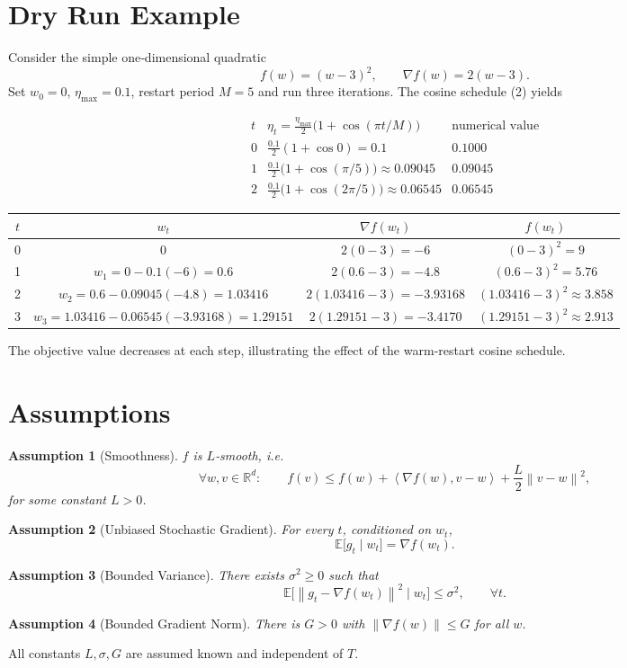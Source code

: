 \documentclass{article}
\newtheorem{assumption}{Assumption}
\newcommand{\E}{\mathbb{E}}
\newcommand{\R}{\mathbb{R}}
\newcommand{\norm}[1]{\left\lVert #1 \right\rVert}
\newcommand{\ip}[2]{\left\langle #1,#2 \right\rangle}
\begin{document}
\section*{Dry Run Example}
Consider the simple one‑dimensional quadratic
\[
f(w)=(w-3)^2,\qquad \nabla f(w)=2(w-3).
\]
Set $w_0=0$, $\eta_{\max}=0.1$, restart period $M=5$ and run three
iterations.  The cosine schedule (2) yields

\[
\begin{array}{c|c|c}
t & \displaystyle\eta_t
     =\tfrac{\eta_{\max}}{2}\bigl(1+\cos(\pi t/M)\bigr) & 
\displaystyle\text{numerical value}\\ \hline
0 & \tfrac{0.1}{2}(1+\cos 0)=0.1 & 0.1000\\
1 & \tfrac{0.1}{2}\bigl(1+\cos(\pi/5)\bigr)
   \approx0.09045 & 0.09045\\
2 & \tfrac{0.1}{2}\bigl(1+\cos(2\pi/5)\bigr)
   \approx0.06545 & 0.06545
\end{array}
\]

\begin{center}
\begin{tabular}{c|c|c|c}
$t$ & $w_t$ & $\nabla f(w_t)$ & $f(w_t)$\\ \hline
0 & $0$ &
$2(0-3)=-6$ &
$(0-3)^2=9$\\
1 & $w_1=0-0.1(-6)=0.6$ &
$2(0.6-3)=-4.8$ &
$(0.6-3)^2=5.76$\\
2 & $w_2=0.6-0.09045(-4.8)=1.03416$ &
$2(1.03416-3)=-3.93168$ &
$(1.03416-3)^2\approx3.858$\\
3 & $w_3=1.03416-0.06545(-3.93168)=1.29151$ &
$2(1.29151-3)=-3.4170$ &
$(1.29151-3)^2\approx2.913$
\end{tabular}
\end{center}
The objective value decreases at each step, illustrating the effect of the
warm‑restart cosine schedule.

\section*{Assumptions}
\begin{assumption}[Smoothness]\label{ass:smooth}
$f$ is $L$‑smooth, i.e.
\[
\forall w,v\in\R^{d}:\qquad
f(v)\le f(w)+\ip{\nabla f(w)}{v-w}+\frac{L}{2}\norm{v-w}^{2},
\]
for some constant $L>0$.
\end{assumption}
\begin{assumption}[Unbiased Stochastic Gradient]\label{ass:unbiased}
For every $t$, conditioned on $w_t$,
\[
\E\bigl[g_t\mid w_t\bigr]=\nabla f(w_t).
\]
\end{assumption}
\begin{assumption}[Bounded Variance]\label{ass:variance}
There exists $\sigma^{2}\ge0$ such that
\[
\E\bigl[\norm{g_t-\nabla f(w_t)}^{2}\mid w_t\bigr]\le\sigma^{2},
\qquad\forall t.
\]
\end{assumption}
\begin{assumption}[Bounded Gradient Norm]\label{ass:gradbound}
There is $G>0$ with $\norm{\nabla f(w)}\le G$ for all $w$.
\end{assumption}
All constants $L,\sigma,G$ are assumed known and independent of $T$.
\end{document}
